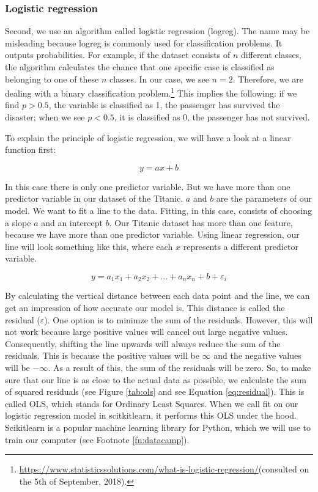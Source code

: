 \documentclass[11pt]{article}
\begin{document}
\subsubsection{Logistic regression}
\label{sec:org097b18f}
Second, we use an algorithm called logistic regression (logreg). The name may be misleading because logreg is commonly used for classification problems. It outputs probabilities. For example, if the dataset consists of \(n\) different classes, the algorithm calculates the chance that one specific case is classified as belonging to one of these \(n\) classes. In our case, we see \(n=2\). Therefore, we are dealing with a binary classification problem.\footnote{\url{https://www.statisticssolutions.com/what-is-logistic-regression/}(consulted on the 5th of September, 2018).} This implies the following: if we find \(p>0.5\), the variable is classified as 1, the passenger has survived the disaster; when we see \(p<0.5\), it is classified as 0, the passenger has not survived. 

To explain the principle of logistic regression, we will have a look at a linear function first:

\begin{equation}
y=ax+b
\end{equation} 

In this case there is only one predictor variable. But we have more than one predictor variable in our dataset of the Titanic. \(a\) and \(b\) are the parameters of our model. We want to fit a line to the data. Fitting, in this case, consists of choosing a slope \(a\) and an intercept \(b\). Our Titanic dataset has more than one feature, because we have more than one predictor variable. Using linear regression, our line will look something like this, where each \(x\) represents a different predictor variable. 

\begin{equation}
y=a_1x_1+a_2x_2+ \dots + a_nx_n+b+\varepsilon_{i}  
\end{equation}

By calculating the vertical distance between each data point and the line, we can get an impression of how accurate our model is. This distance is called the residual (\(\varepsilon\)). One option is to minimze the sum of the residuals. However, this will not work because large positive values will cancel out large negative values. Consequently, shifting the line upwards will always reduce the sum of the residuals. This is because the positive values will be \(\infty\) and the negative values will be \(-\infty\). As a result of this, the sum of the residuals will be zero. So, to make sure that our line is as close to the actual data as possible, we calculate the sum of squared residuals (see Figure \ref{tab:ols} and see Equation \ref{eq:residual}). This is called OLS, which stands for Ordinary Least Squares. When we call fit on our logistic regression model in scitkitlearn, it performs this OLS under the hood. Scikitlearn is a popular machine learning library for Python, which we will use to train our computer (see Footnote \ref{fn:datacamp}).
\end{document}
